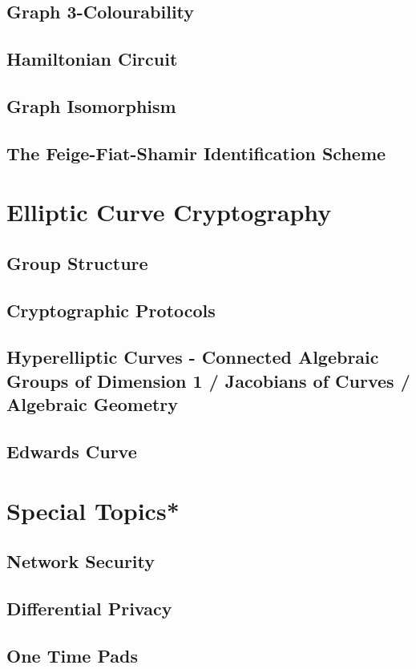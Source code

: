 \documentclass[12pt,a4paper]{article}
\begin{document}
\subsection{Graph 3-Colourability}
\subsection{Hamiltonian Circuit}
\subsection{Graph Isomorphism}
\subsection{The Feige-Fiat-Shamir Identification Scheme}

\section{Elliptic Curve Cryptography}

\subsection{Group Structure} 
\subsection{Cryptographic Protocols}
\subsection{Hyperelliptic Curves - Connected Algebraic Groups of Dimension 1 / Jacobians of Curves / Algebraic Geometry}
\subsection{Edwards Curve}

\section{Special Topics*}
\subsection{Network Security}
\subsection{Differential Privacy}
\subsection{One Time Pads}
\end{document}
